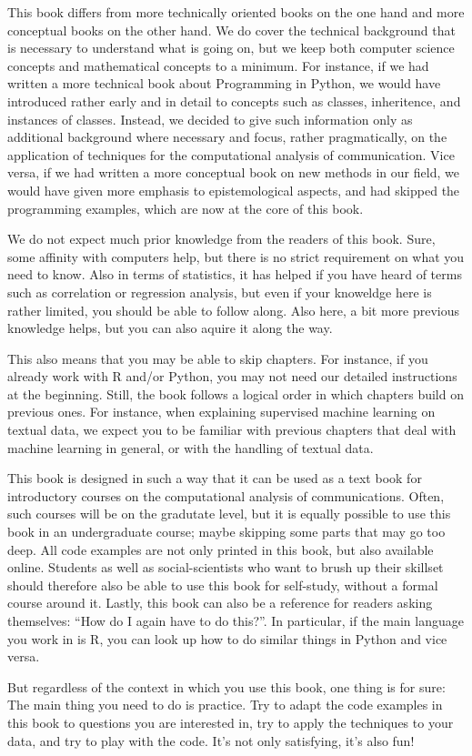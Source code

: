 This book differs from more technically oriented books on the one hand
and more conceptual books on the other hand. We do cover the technical
background that is necessary to understand what is going on, but we
keep both computer science concepts and mathematical concepts to a
minimum. For instance, if we had written a more technical book about
Programming in Python, we would have introduced rather early and in
detail to concepts such as classes, inheritence, and instances of
classes. Instead, we decided to give such information only as
additional background where necessary and focus, rather pragmatically,
on the application of techniques for the computational analysis of
communication. Vice versa, if we had written a more conceptual book on
new methods in our field, we would have given more emphasis to
epistemological aspects, and had skipped the programming examples,
which are now at the core of this book.

We do not expect much prior knowledge from the readers of this
book. Sure, some affinity with computers help, but there is no strict
requirement on what you need to know. Also in terms of statistics, it
has helped if you have heard of terms such as correlation or
regression analysis, but even if your knoweldge here is rather
limited, you should be able to follow along. Also here, a bit more
previous knowledge helps, but you can also aquire it along the way.

This also means that you may be able to skip chapters. For instance,
if you already work with R and/or Python, you may not need our
detailed instructions at the beginning. Still, the book follows a
logical order in which chapters build on previous ones. For instance,
when explaining supervised machine learning on textual data, we expect
you to be familiar with previous chapters that deal with machine
learning in general, or with the handling of textual data.

This book is designed in such a way that it can be used as a text book
for introductory courses on the computational analysis of
communications. Often, such courses will be on the gradutate level,
but it is equally possible to use this book in an undergraduate
course; maybe skipping some parts that may go too deep. All code
examples are not only printed in this book, but also available
online. Students as well as social-scientists who want to brush up
their skillset should therefore also be able to use this book for
self-study, without a formal course around it. Lastly, this book can
also be a reference for readers asking themselves: ``How do I again
have to do this?''. In particular, if the main language you work in is
R, you can look up how to do similar things in Python and vice versa.

But regardless of the context in which you use this book, one thing is
for sure: The main thing you need to do is practice. Try to adapt the
code examples in this book to questions you are interested in, try to
apply the techniques to your data, and try to play with the code. It's
not only satisfying, it's also fun!
